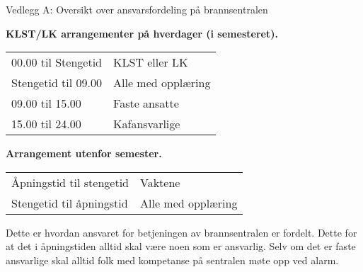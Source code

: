 \begin{instruks}{Vedlegg A: Oversikt over ansvarsfordeling på brannsentralen}{}{}
    
    \textbf{KLST/LK arrangementer på hverdager (i semesteret).}
    
    
    \begin{tabular}{ll}
        00.00 til Stengetid &   KLST eller LK \\
        Stengetid til 09.00 &   Alle med opplæring \\
        09.00 til 15.00 &     Faste ansatte \\
        15.00 til 24.00 &      Kafansvarlige 
    \end{tabular}

    
    \textbf{Arrangement utenfor semester.}
    
    
    \begin{tabular}{ll}
        Åpningstid til stengetid &     Vaktene \\
        Stengetid til åpningstid &     Alle med opplæring
    \end{tabular}

    
    Dette er hvordan ansvaret for betjeningen av brannsentralen er fordelt. Dette for at det i
    åpningstiden alltid skal være
    noen som er ansvarlig. Selv om det er faste ansvarlige skal alltid folk med kompetanse på
    sentralen møte opp ved
    alarm.
\end{instruks}



